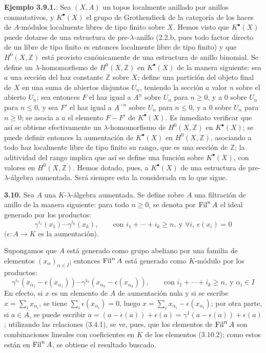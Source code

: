 \textbf{Ejemplo 3.9.1.}: Sea \((X,A)\) un topos localmente anillado por anillos conmutativos, y \(K^\bullet(X)\) el grupo de Grothendieck de la categoría de los haces de \(A\)-módulos localmente libres de tipo finito sobre \(X\). Hemos visto que \(K^\bullet(X)\) puede dotarse de una estructura de pre-\(\lambda\)-anillo (2.2.b, pues todo factor directo de un libre de tipo finito es entonces localmente libre de tipo finito) y que \(H^0(X,\mathbb Z)\) está provisto canónicamente de una estructura de anillo binomial. Se define un \(\lambda\)-homomorfismo de \(H^0(X,\mathbb Z)\) en \(K^\bullet(X)\) de la manera siguiente: sea \(a\) una sección del haz constante \(\mathbb Z\) sobre \(X\); define una partición del objeto final de \(X\) en una suma de abiertos disjuntos \(U_n\), teniendo la sección \(a\) valor \(n\) sobre el abierto \(U_n\); sea entonces \(F\) el haz igual a \(A^n\) sobre \(U_n\) para \(n\ge0\), y a \(0\) sobre \(U_n\) para \(n\le0\), y sea \(F'\) el haz igual a \(A^{-n}\) sobre \(U_n\) para \(n\le0\), y a \(0\) sobre \(U_n\) para \(n\ge0\); se asocia a \(a\) el elemento \(F-F'\) de \(K^\bullet(X)\). Es inmediato verificar que así se obtiene efectivamente un \(\lambda\)-homomorfismo de \(H^0(X,\mathbb Z)\) en \(K^\bullet(X)\); se puede definir entonces la aumentación de \(K^\bullet(X)\) en \(H^0(X,\mathbb Z)\), asociando a todo haz localmente libre de tipo finito su rango, que es una sección de \(\mathbb Z\); la aditividad del rango implica que así se define una función sobre \(K^\bullet(X)\), con valores en \(H^0(X,\mathbb Z)\). Hemos dotado, pues, a \(K^\bullet(X)\) de una estructura de pre-\(\lambda\)-álgebra aumentada. Será siempre esta la considerada en lo que sigue.

\textbf{3.10.} Sea \(A\) una \(K\)-\(\lambda\)-álgebra aumentada. Se define sobre \(A\) una filtración de anillo de la manera siguiente: para todo \(n\ge0\), se denota por \(\operatorname{Fil}^n A\) el ideal generado por los productos:
\begin{equation}\tag{3.10.1}
  \gamma^{i_1}(x_1)\cdots\gamma^{i_k}(x_k),
  \qquad \text{con } i_1+\cdots+i_k\ge n,\ \text{y } \forall i,\ \epsilon(x_i)=0
\end{equation}
\((\epsilon:A\to K\) es la aumentación).

Supongamos que \(A\) está generado como grupo abeliano por una familia de elementos \((x_\alpha)_{\alpha\in I}\); entonces \(\operatorname{Fil}^n A\) está generado como \(K\)-módulo por los productos:
\begin{equation}\tag{3.10.2}
  \gamma^{i_1}(x_{\alpha_1}-\epsilon(x_{\alpha_1}))\cdots
  \gamma^{i_k}(x_{\alpha_k}-\epsilon(x_{\alpha_k})),
  \qquad \text{con } i_1+\cdots+i_k\ge n,\ \text{y } \alpha_i\in I
\end{equation}
En efecto, si \(x\) es un elemento de \(A\) de aumentación nula y si se escribe \(x=\sum_i x_{\alpha_i}\), se tiene \(\sum_i \epsilon(x_{\alpha_i})=0\), luego \(x=\sum_i x_{\alpha_i}-\epsilon(x_{\alpha_i})\); por otra parte, si \(a\in A\), se puede escribir \(a=(a-\epsilon(a))+\epsilon(a)=\gamma^1(a-\epsilon(a))+\epsilon(a)\); utilizando las relaciones (3.4.1), se ve, pues, que los elementos de \(\operatorname{Fil}^n A\) son combinaciones lineales con coeficientes en \(K\) de los elementos (3.10.2); como estos están en \(\operatorname{Fil}^n A\), se obtiene el resultado buscado.

